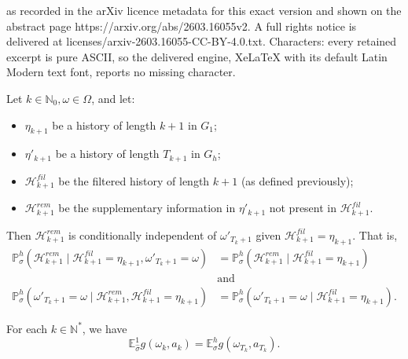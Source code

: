 \documentclass[10pt,a4paper]{amsart}
\newcommand{\E}{\mathbb{E}}
\newcommand{\N}{\mathbb{N}}
\renewcommand{\P}{\mathbb{P}}
\begin{document}
as recorded in the arXiv licence metadata for this exact version and shown on the abstract page https://arxiv.org/abs/2603.16055v2. A full rights notice is delivered at licenses/arxiv-2603.16055-CC-BY-4.0.txt. Characters: every retained excerpt is pure ASCII, so the delivered engine, XeLaTeX with its default Latin Modern text font, reports no missing character.
\begin{lemma}
Let $k \in \N_0, \omega \in \Omega$, and let: 
\begin{itemize}
	\item $\eta_{k+1}$ be a history of length $k+1$ in $G_1$;
	\item $\eta'_{k+1}$ be a history of length $T_{k+1}$ in $G_h$;
	\item $\mathcal H^{fil}_{k+1}$ be the filtered history of length $k+1$ (as defined previously);
	\item $\mathcal H^{rem}_{k+1}$ be the supplementary information in $\eta'_{k+1}$ not present in $\mathcal{H}_{k+1}^{fil}$.
\end{itemize}

Then $\mathcal{H}_{k+1}^{rem}$ is conditionally independent of $\omega'_{T_{k}+1}$ given $\mathcal H^{fil}_{k+1} = \eta_{k+1}$. That is,
	\begin{align*}
		\P_{\sigma}^h (\mathcal H^{rem}_{k+1} \mid \mathcal H^{fil}_{k+1} = \eta_{k+1}, \omega'_{T_k + 1} = \omega) &= \P_{\sigma}^h (\mathcal H^{rem}_{k+1} \mid \mathcal H^{fil}_{k+1} = \eta_{k+1})\\
		&\text{and}\\
		\P_{\sigma}^h(\omega'_{T_{k}+1} = \omega \mid \mathcal{H}_{k+1}^{rem}, \mathcal H^{fil}_{k+1} = \eta_{k+1}) &= \P_{\sigma}^h(\omega'_{T_{k}+1} = \omega \mid \mathcal H^{fil}_{k+1} = \eta_{k+1}).
	\end{align*}
\label{aux-lemma}
\end{lemma}

\begin{lemma}
For each $k \in \N^*$, we have
$$\E_{\widehat \sigma}^1 g(\omega_k, a_k) = \E_\sigma^h g(\omega_{T_k}, a_{T_k}).$$
\label{lemma1}
\end{lemma}
\end{document}
